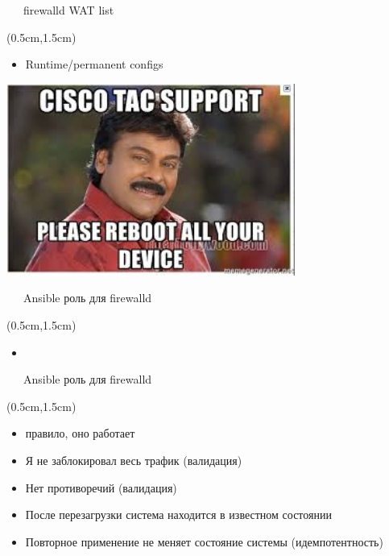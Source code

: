 \documentclass[xetex,18pt,aspectratio=43]{beamer}
\begin{document}
\begin{Large}
\begin{frame}{\ \ \ firewalld WAT list}
\begin{textblock*}{\framewidth-0.8cm}(0.5cm,1.5cm)
\begin{itemize}
  \item Runtime/permanent configs
\end{itemize}
\begin{minipage}{\textwidth}
  \centering
  \includegraphics[height=6.3cm]{img/tac}
\end{minipage}
\end{textblock*}
\end{frame}

\begin{frame}{\ \ \ Ansible роль для firewalld}
\begin{textblock*}{\framewidth-0.8cm}(0.5cm,1.5cm)
\begin{itemize}
  \item \href{https://github.com/kofonfor/ansible-role-firewalld}{\color{blue}{https://github.com/kofonfor/ansible-role-firewalld}}
\end{itemize}
\end{textblock*}
\end{frame}

\begin{frame}{\ \ \ Ansible роль для firewalld}
\begin{textblock*}{\framewidth-0.8cm}(0.5cm,1.5cm)
\begin{itemize}
  \item {\color {darkpastelgreen}{\bf Я добавляю} правило, оно работает}
  \item {\color {red}Я не заблокировал весь трафик (валидация)}
  \item {\color {red}Нет противоречий (валидация)}
  \item {\color {darkpastelgreen}После перезагрузки система находится в изве}{\color {red}стном состоянии}
  \item {\color {red}Повторное применение не меняет состояние системы (идемпотентность)}
\end{itemize}
\end{textblock*}
\end{frame}


\end{Large}
\end{document}
